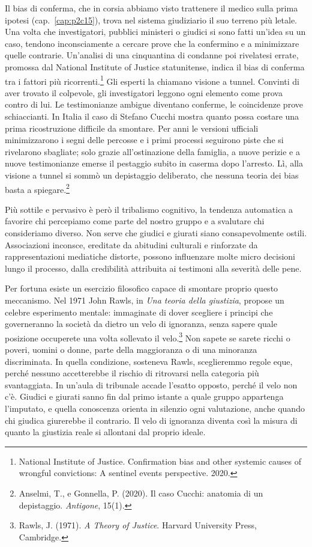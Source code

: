 Il bias di conferma, che in corsia abbiamo visto trattenere il medico sulla prima ipotesi (cap.~\ref{cap:p2c15}), trova nel sistema giudiziario il suo terreno pi\`{u} letale. Una volta che investigatori, pubblici ministeri o giudici si sono fatti un'idea su un caso, tendono inconsciamente a cercare prove che la confermino e a minimizzare quelle contrarie. Un'analisi di una cinquantina di condanne poi rivelatesi errate, promossa dal National Institute of Justice statunitense, indica il bias di conferma tra i fattori pi\`{u} ricorrenti.\footnote{National Institute of Justice. Confirmation bias and other systemic causes of wrongful convictions: A sentinel events perspective. 2020.} Gli esperti la chiamano visione a tunnel. Convinti di aver trovato il colpevole, gli investigatori leggono ogni elemento come prova contro di lui. Le testimonianze ambigue diventano conferme, le coincidenze prove schiaccianti. In Italia il caso di Stefano Cucchi mostra quanto possa costare una prima ricostruzione difficile da smontare. Per anni le versioni ufficiali minimizzarono i segni delle percosse e i primi processi seguirono piste che si rivelarono sbagliate; solo grazie all'ostinazione della famiglia, a nuove perizie e a nuove testimonianze emerse il pestaggio subito in caserma dopo l'arresto. L\`{i}, alla visione a tunnel si sommò un depistaggio deliberato, che nessuna teoria dei bias basta a spiegare.\footnote{Anselmi, T., e Gonnella, P. (2020). Il caso Cucchi: anatomia di un depistaggio. \textit{Antigone}, 15(1).}

Pi\`{u} sottile e pervasivo \`{e} per\`{o} il tribalismo cognitivo, la tendenza automatica a favorire chi percepiamo come parte del nostro gruppo e a svalutare chi consideriamo diverso. Non serve che giudici e giurati siano consapevolmente ostili. Associazioni inconsce, ereditate da abitudini culturali e rinforzate da rappresentazioni mediatiche distorte, possono influenzare molte micro decisioni lungo il processo, dalla credibilit\`{a} attribuita ai testimoni alla severit\`{a} delle pene.

Per fortuna esiste un esercizio filosofico capace di smontare proprio questo meccanismo. Nel 1971 John Rawls, in \textit{Una teoria della giustizia}, propose un celebre esperimento mentale: immaginate di dover scegliere i principi che governeranno la societ\`{a} da dietro un velo di ignoranza, senza sapere quale posizione occuperete una volta sollevato il velo.\footnote{Rawls, J. (1971). \textit{A Theory of Justice}. Harvard University Press, Cambridge.} Non sapete se sarete ricchi o poveri, uomini o donne, parte della maggioranza o di una minoranza discriminata. In quella condizione, sosteneva Rawls, sceglieremmo regole eque, perch\'{e} nessuno accetterebbe il rischio di ritrovarsi nella categoria pi\`{u} svantaggiata. In un'aula di tribunale accade l'esatto opposto, perch\'{e} il velo non c'\`{e}. Giudici e giurati sanno fin dal primo istante a quale gruppo appartenga l'imputato, e quella conoscenza orienta in silenzio ogni valutazione, anche quando chi giudica giurerebbe il contrario. Il velo di ignoranza diventa cos\`{i} la misura di quanto la giustizia reale si allontani dal proprio ideale.

